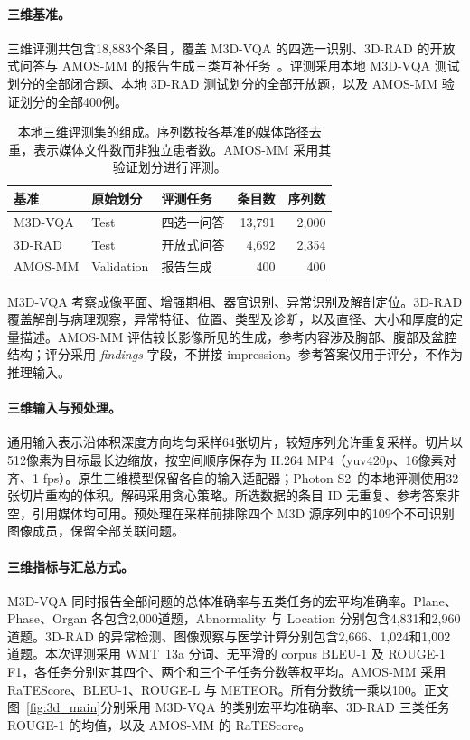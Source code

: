 \paragraph{三维基准。}
\label{app:datasets_3d}

三维评测共包含18,883个条目，覆盖 M3D-VQA 的四选一识别、3D-RAD 的开放式问答与 AMOS-MM 的报告生成三类互补任务~\citep{bai2024m3d,gai2025threedrad,ji2024amosmm}。评测采用本地 M3D-VQA 测试划分的全部闭合题、本地 3D-RAD 测试划分的全部开放题，以及 AMOS-MM 验证划分的全部400例。

\begin{table}[H]
\centering\small
\caption{本地三维评测集的组成。序列数按各基准的媒体路径去重，表示媒体文件数而非独立患者数。AMOS-MM 采用其验证划分进行评测。}
\label{tab:datasets_3d}
\setlength{\tabcolsep}{4pt}
\renewcommand{\arraystretch}{1.10}
\begin{tabularx}{\linewidth}{@{}llYrr@{}}
\toprule
基准 & 原始划分 & 评测任务 & 条目数 & 序列数\\
\midrule
M3D-VQA & Test & 四选一问答 & 13,791 & 2,000\\
3D-RAD & Test & 开放式问答 & 4,692 & 2,354\\
AMOS-MM & Validation & 报告生成 & 400 & 400\\
\bottomrule
\end{tabularx}
\end{table}

M3D-VQA 考察成像平面、增强期相、器官识别、异常识别及解剖定位。3D-RAD 覆盖解剖与病理观察，异常特征、位置、类型及诊断，以及直径、大小和厚度的定量描述。AMOS-MM 评估较长影像所见的生成，参考内容涉及胸部、腹部及盆腔结构；评分采用 \emph{findings} 字段，不拼接 impression。参考答案仅用于评分，不作为推理输入。

\paragraph{三维输入与预处理。}
通用输入表示沿体积深度方向均匀采样64张切片，较短序列允许重复采样。切片以512像素为目标最长边缩放，按空间顺序保存为 H.264 MP4（yuv420p、16像素对齐、1 fps）。原生三维模型保留各自的输入适配器；Photon S2~\citep{fang2026photon}的本地评测使用32张切片重构的体积。解码采用贪心策略。所选数据的条目 ID 无重复、参考答案非空，引用媒体均可用。预处理在采样前排除四个 M3D 源序列中的109个不可识别图像成员，保留全部关联问题。

\paragraph{三维指标与汇总方式。}
M3D-VQA 同时报告全部问题的总体准确率与五类任务的宏平均准确率。Plane、Phase、Organ 各包含2,000道题，Abnormality 与 Location 分别包含4,831和2,960道题。3D-RAD 的异常检测、图像观察与医学计算分别包含2,666、1,024和1,002道题。本次评测采用 WMT~13a 分词、无平滑的 corpus BLEU-1 及 ROUGE-1 F1，各任务分别对其四个、两个和三个子任务分数等权平均。AMOS-MM 采用 RaTEScore、BLEU-1、ROUGE-L 与 METEOR。所有分数统一乘以100。正文图~\ref{fig:3d_main}分别采用 M3D-VQA 的类别宏平均准确率、3D-RAD 三类任务 ROUGE-1 的均值，以及 AMOS-MM 的 RaTEScore。
